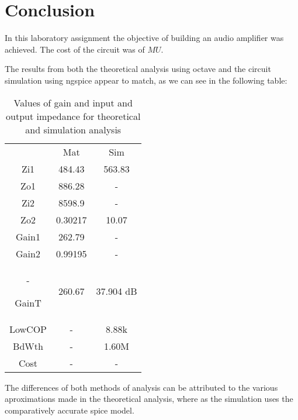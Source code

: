 \section{Conclusion}
\label{sec:conclusion}

In this laboratory assignment the objective of building an audio amplifier was achieved.
 The cost of the circuit was of $ MU$.
 
The results from both the theoretical analysis using octave and the circuit
simulation using ngspice appear to match, as we can see in the following table:

\begin{table}[H]
\addtolength{\tabcolsep}{-4pt}
\caption{Values of gain and input and output impedance for theoretical and simulation analysis}
\vspace{-3mm}
\begin{tabular}{|c|c|c|}
\hline
 &	Mat &	Sim\\

Zi1 &484.43&	563.83\\

Zo1&886.28	&-\\

Zi2&	8598.9	&-\\

Zo2&	0.30217&	10.07\\

Gain1&	262.79	&-\\

Gain2&	0.99195&-\\	-

GainT&	260.67	&37.904 dB\\

LowCOP&	-&	8.88k\\

BdWth	&-	&1.60M\\

Cost	&-&	-\\
\hline
\end{tabular}
\label{tab:Comparison}
\end{table}


The differences of both methods of analysis can be attributed to the various aproximations
made in the theoretical analysis, where as the simulation uses the comparatively accurate spice model.
